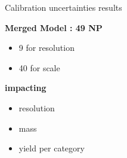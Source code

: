\begin{frame}{Calibration uncertainties results}

  \begin{minipage}{0.49\linewidth}
    \centering
    {\bf Merged Model : 49 NP }
    \begin{itemize}
    \item 9 for resolution
    \item 40 for scale
    \end{itemize}
    \vfill
    {\bf impacting }
    \begin{itemize}
    \item resolution
    \item mass
    \item yield per category
      \end{itemize}
  \end{minipage}
  \hfill
  \begin{minipage}{0.49\linewidth}
  \end{minipage}


\end{frame}
